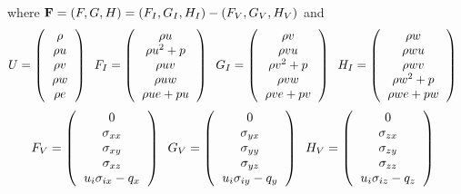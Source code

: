 where ${\bf F} = (F,G,H) = (F_I,G_I,H_I) - (F_V,G_V,H_V)$ and
\begin{equation}
U = \l(
\begin{tabular}{c}
$\rho$\\
$\rho u$\\
$\rho v$\\
$\rho w$\\
$\rho e$
\end{tabular}
\r) \;\; 
F_I = \l(
\begin{tabular}{c}
$\rho u$\\
$\rho u^2 + p$\\
$\rho uv$\\
$\rho uw$\\
$\rho ue + pu$
\end{tabular}
\r) \;\; 
G_I = \l(
\begin{tabular}{c}
$\rho v$\\
$\rho vu$\\
$\rho v^2 + p$\\
$\rho vw$\\
$\rho ve+pv$
\end{tabular}
\r) \;\; 
H_I = \l(
\begin{tabular}{c}
$\rho w$\\
$\rho wu$\\
$\rho wv$\\
$\rho w^2 + p$\\
$\rho we + pw$
\end{tabular}
\r) \;\; 
\end{equation}
\begin{equation}
F_V = \l(
\begin{tabular}{c}
$0$\\
$\sigma_{xx}$\\
$\sigma_{xy}$\\
$\sigma_{xz}$\\
$u_i\sigma_{ix}-q_x$
\end{tabular}
\r) \;\; 
G_V = \l(
\begin{tabular}{c}
$0$\\
$\sigma_{yx}$\\
$\sigma_{yy}$\\
$\sigma_{yz}$\\
$u_i\sigma_{iy}-q_y$
\end{tabular}
\r) \;\; 
H_V = \l(
\begin{tabular}{c}
$0$\\
$\sigma_{zx}$\\
$\sigma_{zy}$\\
$\sigma_{zz}$\\
$u_i\sigma_{iz}-q_z$
\end{tabular}
\r) \;\; 
\end{equation}

